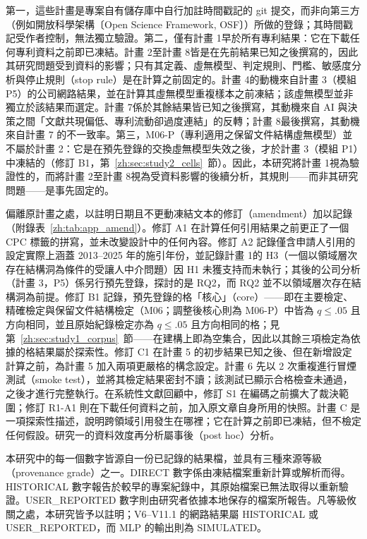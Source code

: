 第一，這些計畫是專案自有儲存庫中自行加註時間戳記的 git 提交，而非向第三方（例如開放科學架構〔Open Science Framework, OSF〕）所做的登錄；其時間戳記受作者控制，無法獨立驗證。第二，僅有計畫 1早於所有專利結果：它在下載任何專利資料之前即已凍結。計畫 2至計畫 8皆是在先前結果已知之後撰寫的，因此其研究問題受到資料的影響；只有其定義、虛無模型、判定規則、門檻、敏感度分析與停止規則（stop rule）是在計算之前固定的。計畫 4的動機來自計畫 3（模組 P5）的公司網路結果，並在計算其虛無模型重複樣本之前凍結；該虛無模型並非獨立於該結果而選定。計畫 7係於其餘結果皆已知之後撰寫，其動機來自 AI 與決策之間「文獻共現偏低、專利流動卻過度連結」的反轉；計畫 8最後撰寫，其動機來自計畫 7 的不一致率。第三，M06-P（專利適用之保留文件結構虛無模型）並不屬於計畫 2：它是在預先登錄的交換虛無模型失效之後，才於計畫 3（模組 P1）中凍結的（修訂 B1，第~\ref{zh:sec:study2_cells}~節）。因此，本研究將計畫 1視為驗證性的，而將計畫 2至計畫 8視為受資料影響的後續分析，其規則——而非其研究問題——是事先固定的。

偏離原計畫之處，以註明日期且不更動凍結文本的修訂（amendment）加以記錄（附錄表~\ref{zh:tab:app_amend}）。修訂 A1 在計算任何引用結果之前更正了一個 CPC 標籤的拼寫，並未改變設計中的任何內容。修訂 A2 記錄僅含申請人引用的設定實際上涵蓋 2013--2025 年的施引年份，並記錄計畫 1的 H3（一個以領域層次存在結構洞為條件的受讓人中介問題）因 H1 未獲支持而未執行；其後的公司分析（計畫 3，P5）係另行預先登錄，探討的是 RQ2，而 RQ2 並不以領域層次存在結構洞為前提。修訂 B1 記錄，預先登錄的格「核心」（core）——即在主要檢定、精確檢定與保留文件結構檢定（M06；調整後核心則為 M06-P）中皆為 $q \le .05$ 且方向相同，並且原始紀錄檢定亦為 $q \le .05$ 且方向相同的格；見第~\ref{zh:sec:study1_corpus}~節——在建構上即為空集合，因此以其餘三項檢定為依據的格結果屬於探索性。修訂 C1 在計畫 5 的初步結果已知之後、但在新增設定計算之前，為計畫 5 加入兩項更嚴格的構念設定。計畫 6 先以 2 次重複進行冒煙測試（smoke test），並將其檢定結果密封不讀；該測試已顯示合格檢查未通過，之後才進行完整執行。在系統性文獻回顧中，修訂 S1 在編碼之前擴大了裁決範圍；修訂 R1-A1 則在下載任何資料之前，加入原文章自身所用的快照。計畫 C 是一項探索性描述，說明跨領域引用發生在哪裡；它在計算之前即已凍結，但不檢定任何假設。研究一的資料效度再分析屬事後（post hoc）分析。

本研究中的每一個數字皆源自一份已記錄的結果檔，並具有三種來源等級（provenance grade）之一。DIRECT 數字係由凍結檔案重新計算或解析而得。HISTORICAL 數字報告於較早的專案紀錄中，其原始檔案已無法取得以重新驗證。USER\_\allowbreak REPORTED 數字則由研究者依據本地保存的檔案所報告。凡等級攸關之處，本研究皆予以註明；V6--V11.1 的網路結果屬 HISTORICAL 或 USER\_\allowbreak REPORTED，而 MLP 的輸出則為 SIMULATED。

